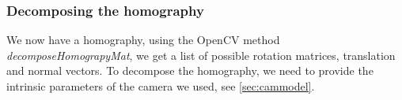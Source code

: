 \subsubsection{Decomposing the homography}
We now have a homography, using the OpenCV method \textit{decomposeHomograpyMat}, we get a list of possible rotation matrices, translation and normal vectors. To decompose the homography, we need to provide the intrinsic parameters of the camera we used, see \autoref{sec:cammodel}.